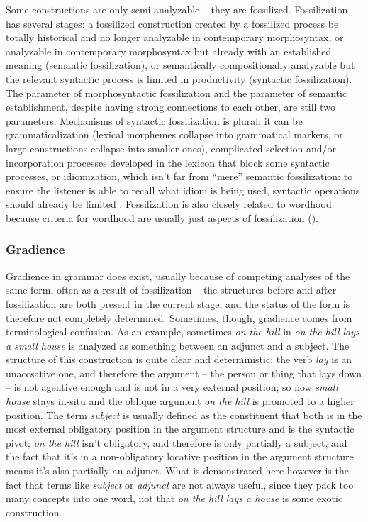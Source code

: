 \documentclass[UTF8, a4paper, oneside, scheme=plain, 12pt]{ctexbook}
\newcommand*{\term}[1]{\emph{#1}}
\newcommand{\form}[1]{\emph{#1}}
\begin{document}
{Some constructions are only semi-analyzable -- 
they are fossilized.
Fossilization has several stages:
a fossilized construction created by a fossilized process 
be totally historical and no longer analyzable in contemporary morphosyntax,
or analyzable in contemporary morphosyntax but already with an established meaning
(semantic fossilization),
or semantically compositionally analyzable 
but the relevant syntactic process is limited in productivity 
(syntactic fossilization).
The parameter of morphosyntactic fossilization 
and the parameter of semantic establishment,
despite having strong connections to each other,
are still two parameters.
Mechanisms of syntactic fossilization is plural: 
it can be grammaticalization 
(lexical morphemes collapse into grammatical markers, 
or large constructions collapse into smaller ones), 
complicated selection and/or incorporation processes developed in the lexicon 
that block some syntactic processes, 
or idiomization, which isn't far from ``mere'' semantic fossilization: 
to ensure the listener is able to recall what idiom is being used, 
syntactic operations should already be limited \citep{nediger2017unifying}.
Fossilization is also closely related to wordhood 
because criteria for wordhood are usually just aspects of fossilization 
().

\subsubsection{Gradience}

Gradience in grammar does exist, 
usually because of competing analyses of the same form, 
often as a result of fossilization -- 
the structures before and after fossilization are both present 
in the current stage, 
and the status of the form is therefore not completely determined. 
Sometimes, though, gradience comes from terminological confusion.
As an example, sometimes \form{on the hill} in 
\form{on the hill lays a small house}
is analyzed as something between an adjunct and a subject.
The structure of this construction is quite clear and deterministic:
the verb \form{lay} is an unaccsative one, 
and therefore the argument -- the person or thing that lays down -- 
is not agentive enough and is not in a very external position;
so now \form{small house} stays in-situ 
and the oblique argument \form{on the hill} is promoted to a higher position. 
The term \term{subject} is usually defined as 
the constituent that both is in  
the most external obligatory position in the argument structure 
and is the syntactic pivot; 
\form{on the hill} isn't obligatory, 
and therefore is only partially a subject, 
and the fact that it's in a non-obligatory locative position in the argument structure 
means it's also partially an adjunct. 
What is demonstrated here however is the fact that 
terms like \term{subject} or \term{adjunct} 
are not always useful, since they pack too many concepts into one word, 
not that \form{on the hill lays a house} is some exotic construction.

}
\end{document}
